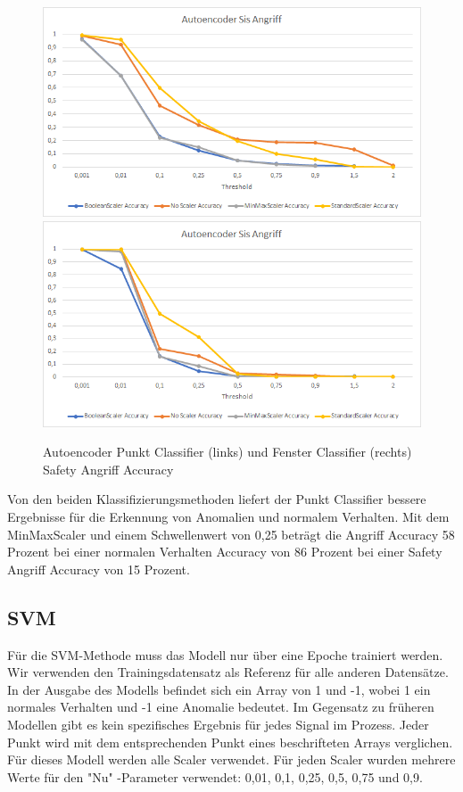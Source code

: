 \documentclass[12pt,a4paper]{scrartcl}
\numberwithin{equation}{section}
\begin{document}
\begin{figure}[ht!]
	\centering
	  \includegraphics[scale=0.5]{sis_autoencoder_40.png}
	  \includegraphics[scale=0.51]{sis_autoencoder_40_classifier.png}
	  \caption{Autoencoder Punkt Classifier (links) und Fenster Classifier (rechts) Safety Angriff Accuracy}
	\label{sis_autoencoder}
\end{figure}

Von den beiden Klassifizierungsmethoden liefert der Punkt Classifier bessere Ergebnisse für die Erkennung von Anomalien und normalem Verhalten. Mit dem MinMaxScaler und einem Schwellenwert von 0,25 beträgt die Angriff Accuracy 58 Prozent bei einer normalen Verhalten Accuracy von 86 Prozent bei einer Safety Angriff Accuracy von 15 Prozent. 

\subsection{SVM}

Für die SVM-Methode muss das Modell nur über eine Epoche trainiert werden. Wir verwenden den Trainingsdatensatz als Referenz für alle anderen Datensätze. In der Ausgabe des Modells befindet sich ein Array von 1 und -1, wobei 1 ein normales Verhalten und -1 eine Anomalie bedeutet. Im Gegensatz zu früheren Modellen gibt es kein spezifisches Ergebnis für jedes Signal im Prozess. Jeder Punkt wird mit dem entsprechenden Punkt eines beschrifteten Arrays verglichen. Für dieses Modell werden alle Scaler verwendet. Für jeden Scaler wurden mehrere Werte für den "Nu" -Parameter verwendet: 0,01, 0,1, 0,25, 0,5, 0,75 und 0,9. 
\end{document}
